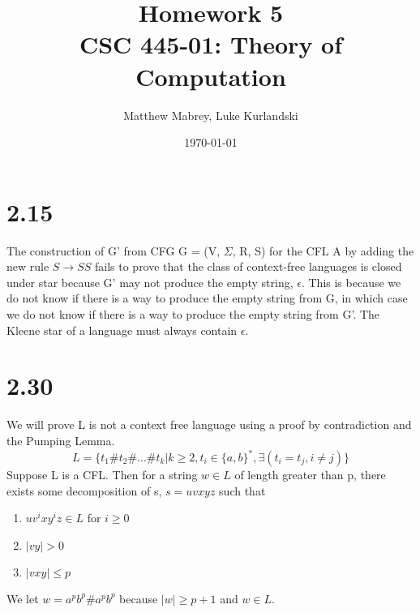 \documentclass{article}
\title{Homework 5\\[0.2em]\smaller{}CSC 445-01: Theory of Computation}
\author{Matthew Mabrey, Luke Kurlandski}
\date{\today}
\begin{document}
\maketitle

\section*{2.15}
The construction of G' from CFG G = (V, $\Sigma$, R, S) for the CFL A by adding the new rule $S \rightarrow SS$ fails to prove that the class of context-free languages is closed under star because G' may not produce the empty string, $\epsilon$. This is because we do not know if there is a way to produce the empty string from G, in which case we do not know if there is a way to produce the empty string from G'. The Kleene star of a language must always contain $\epsilon$. 

\section*{2.30}

We will prove L is not a context free language using a proof by contradiction and the Pumping Lemma.
$$L = \{ t_1\#t_2\#...\#t_k | k \geq 2, t_i \in \{ a, b\}^*, \exists ( t_i = t_j,  i \neq j ) \}$$
Suppose L is a CFL. Then for a string $w \in L$ of length greater than p, there exists some decomposition of s, $s = uvxyz$ such that 
\begin{enumerate}
    \item $uv^ixy^iz \in L$ for $i \geq 0$
    \item $|vy| > 0$
    \item $|vxy| \leq p$
\end{enumerate}
We let $w = a^pb^p\#a^pb^p$ because $|w| \geq p + 1$ and $w \in L$.
\end{document}
